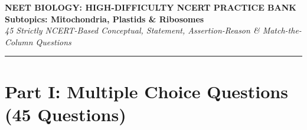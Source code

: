 \documentclass[11pt, a4paper]{article}
\begin{document}
\begin{center}
    {\Large \textbf{\color{primary} NEET BIOLOGY: HIGH-DIFFICULTY NCERT PRACTICE BANK}} \\[6pt]
    {\large \textbf{\color{secondary} Subtopics: Mitochondria, Plastids \& Ribosomes}} \\[4pt]
    {\small \textit{45 Strictly NCERT-Based Conceptual, Statement, Assertion-Reason \& Match-the-Column Questions}}
\end{center}

\vspace{4pt}
\hrule
\vspace{10pt}

\section*{\color{primary} Part I: Multiple Choice Questions (45 Questions)}
\end{document}
